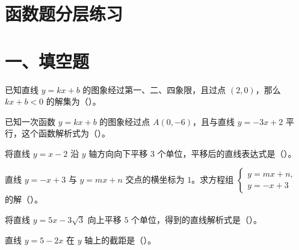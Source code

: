 \documentclass{exam-zh}
\newenvironment{diagramcoltikz}[2]{%
  \begin{minipage}[t]{#1}
    \vspace{0pt}\centering
    \def\diagramcaption{#2}%
    \begin{lrbox}{\diagramtikzbox}%
}{%
    \end{lrbox}%
    \usebox{\diagramtikzbox}%
    \ifx\diagramcaption\empty\else
      \par\vspace{1mm}{\scriptsize\color{edu-diagram-muted}\diagramcaption}
    \fi
  \end{minipage}%
}
\newenvironment{answerareawithdiagramtikz}[3]{%
  \par\vspace{2mm}%
  \noindent
  \begin{minipage}[t]{\dimexpr\linewidth-#2-6mm\relax}
    \vspace{0pt}\rule{0pt}{#1}
  \end{minipage}\hfill
  \begin{diagramcoltikz}{#2}{#3}
}{%
  \end{diagramcoltikz}
  \par\vspace{2mm}%
}
\begin{document}
\section*{函数题分层练习}

\section*{一、填空题}


\begin{question}[points=4]
  已知直线 $y=kx+b$ 的图象经过第一、二、四象限，且过点 $(2,0)$，那么 $kx+b<0$ 的解集为（\qquad）。
\end{question}



\begin{question}[points=4]
  已知一次函数 $y=kx+b$ 的图象经过点 $A(0,-6)$，且与直线 $y=-3x+2$ 平行，这个函数解析式为（\qquad）。
\end{question}



\begin{question}[points=4]
  将直线 $y=x-2$ 沿 $y$ 轴方向向下平移 $3$ 个单位，平移后的直线表达式是（\qquad）。
\end{question}



\begin{question}[points=4]
  直线 $y=-x+3$ 与 $y=mx+n$ 交点的横坐标为 $1$。求方程组 $\begin{cases}y=mx+n,\\ y=-x+3\end{cases}$ 的解（\qquad）。
\end{question}



\begin{question}[points=4]
  将直线 $y=5x-3\sqrt3$ 向上平移 $5$ 个单位，得到的直线解析式是（\qquad）。
\end{question}



\begin{question}[points=4]
  直线 $y=5-2x$ 在 $y$ 轴上的截距是（\qquad）。
\end{question}



\begin{problem}[points=6]
    如图，直线 $y_1=-2x$ 与 $y_2=ax+3$ 的图象相交于点 $A(-1,2)$，则当 $y_1<y_2$ 时，$x$ 的取值范围是（\qquad）。
  \begin{answerareawithdiagramtikz}{28mm}{70mm}{两条直线交于点 A}
  }
  \end{answerareawithdiagramtikz}
\end{problem}
\end{document}
